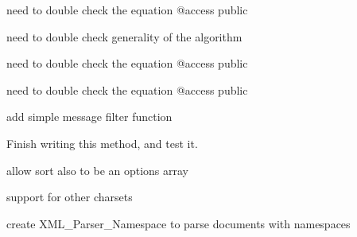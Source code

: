 
\begin{DoxyRefList}
\item[Member \mbox{\hyperlink{classBase_a0c0a7f92eb54eecaeb7b921d630a8ee5}{Base::interquartile\+Mean}} ()]\label{todo__todo000011}%
%
need to double check the equation @access public  
\item[Member \mbox{\hyperlink{classBase_a5f66602c3934b48490aff3a8ca3af530}{Base::percentile}} (\$p)]\label{todo__todo000014}%
%
need to double check generality of the algorithm 
\item[Member \mbox{\hyperlink{classBase_ad60458b9d484bb8c2a7d9323f89d0d8f}{Base::quartile\+Skewness\+Coefficient}} ()]\label{todo__todo000013}%
%
need to double check the equation @access public  
\item[Member \mbox{\hyperlink{classBase_a4cf514317ee1def7320db4b3e87f5212}{Base::quartile\+Variation\+Coefficient}} ()]\label{todo__todo000012}%
%
need to double check the equation @access public  
\item[Namespace \mbox{\hyperlink{namespaceMail__IMAPv2}{Mail\+\_\+\+I\+M\+A\+Pv2}} ]\label{todo__todo000001}%
%
add simple message filter function  
\item[Member \mbox{\hyperlink{classMail__IMAPv2_a16353d9f5a7f2c19190938e21b4cce4a}{Mail\+\_\+\+I\+M\+A\+Pv2::error\+Template}} ()]\label{todo__todo000002}%
%
Finish writing this method, and test it.  
\item[Member \mbox{\hyperlink{classPEAR__PackageFile__Generator__v2__XML__Util_a695b8344d9707a4f9a81b5be040043c2}{P\+E\+A\+R\+\_\+\+Package\+File\+\_\+\+Generator\+\_\+v2\+\_\+\+X\+M\+L\+\_\+\+Util::attributes\+To\+String}} (\$attributes, \$sort=true, \$multiline=false, \$indent=\textquotesingle{} \textquotesingle{}, \$linebreak=\char`\"{}\textbackslash{}\textbackslash{}n\char`\"{}, \$entities=P\+E\+A\+R\+\_\+\+Package\+File\+\_\+\+Generator\+\_\+v2\+\_\+\+X\+M\+L\+\_\+\+Util\+\_\+\+E\+N\+T\+I\+T\+I\+E\+S\+\_\+\+X\+ML)]\label{todo__todo000003}%
%
allow sort also to be an options array  
\item[Member \mbox{\hyperlink{classPEAR__PackageFile__Generator__v2__XML__Util_a357ac2f42ed9289c935f44917f262253}{P\+E\+A\+R\+\_\+\+Package\+File\+\_\+\+Generator\+\_\+v2\+\_\+\+X\+M\+L\+\_\+\+Util::is\+Valid\+Name}} (\$string)]\label{todo__todo000004}%
%
support for other charsets  
\item[Namespace \mbox{\hyperlink{namespaceXML__Parser}{X\+M\+L\+\_\+\+Parser}} ]\label{todo__todo000005}%
%
create X\+M\+L\+\_\+\+Parser\+\_\+\+Namespace to parse documents with namespaces 


\end{DoxyRefList}

